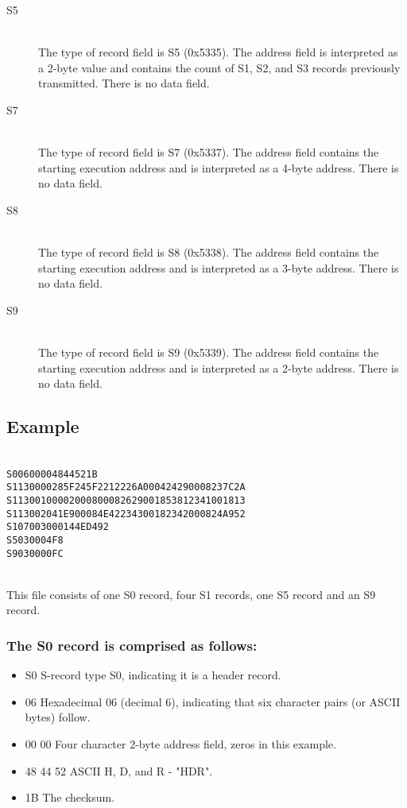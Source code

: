 \begin{description}
            \item[S5]~\\
                The type of record field is S5 (0x5335). The address field is interpreted as a 2-byte value and contains the count of S1, S2, and S3 records previously transmitted. There is no data field.

            \item[S7]~\\
                The type of record field is S7 (0x5337). The address field contains the starting execution address and is interpreted as a 4-byte address. There is no data field.

            \item[S8]~\\
                The type of record field is S8 (0x5338). The address field contains the starting execution address and is interpreted as a 3-byte address. There is no data field.

            \item[S9]~\\
                The type of record field is S9 (0x5339). The address field contains the starting execution address and is interpreted as a 2-byte address. There is no data field.
        \end{description}

    \subsection{Example}
        ~\\
        \verb'S00600004844521B'\\
        \verb'S1130000285F245F2212226A000424290008237C2A'\\
        \verb'S11300100002000800082629001853812341001813'\\
        \verb'S113002041E900084E42234300182342000824A952'\\
        \verb'S107003000144ED492'\\
        \verb'S5030004F8'\\
        \verb'S9030000FC'

        ~\\This file consists of one S0 record, four S1 records, one S5 record and an S9 record.

    \subsubsection{The S0 record is comprised as follows:}
        \begin{itemize}
            \item S0 S-record type S0, indicating it is a header record.
            \item 06 Hexadecimal 06 (decimal 6), indicating that six character pairs (or ASCII bytes) follow.
            \item 00 00 Four character 2-byte address field, zeros in this example.
            \item 48 44 52 ASCII H, D, and R - "HDR".
            \item 1B The checksum.
        \end{itemize}

